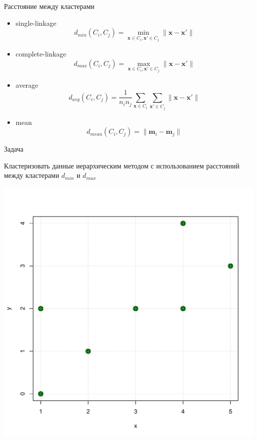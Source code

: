 \documentclass[10pt,a4paper]{beamer}
\begin{document}

\begin{frame}{Расстояние между кластерами}

\begin{itemize}
\item single-linkage
\[
d_{min}(C_i, C_j) = \min_{\mathbf{x} \in C_i, \mathbf{x}' \in C_j} \|\mathbf{x} -\mathbf{x}' \|
\]
\item complete-linkage
\[
d_{max}(C_i, C_j) = \max_{\mathbf{x} \in C_i, \mathbf{x}' \in C_j} \|\mathbf{x} -\mathbf{x}' \|
\]
\item average
\[
d_{avg}(C_i, C_j) = \frac{1}{n_i n_j}\sum_{\mathbf{x} \in C_i}\sum_{\mathbf{x}' \in C_j} \|\mathbf{x} -\mathbf{x}' \|
\]
\item mean
\[
d_{mean}(C_i, C_j) = \|\mathbf{m}_i -\mathbf{m}_j \|
\]
\end{itemize}

\end{frame}


\begin{frame}{Задача}

Кластеризовать данные иерархическим методом с использованием расстояний между кластерами $d_{min}$ и $d_{max}$
\begin{center}
\includegraphics[scale=0.4]{images/problem.pdf}
\end{center}

\end{frame}
\end{document}
